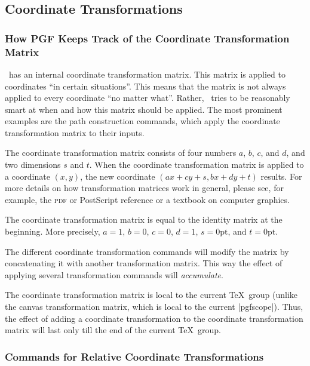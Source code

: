 \subsection{Coordinate Transformations}
\label{section-linear-coordinate-transformations}

\subsubsection{How PGF Keeps Track of the Coordinate Transformation Matrix}
\label{section-transform-cm}

\pgfname\ has an internal coordinate transformation matrix. This matrix is
applied to coordinates ``in certain situations''. This means that the matrix is
not always applied to every coordinate ``no matter what''. Rather, \pgfname\
tries to be reasonably smart at when and how this matrix should be applied. The
most prominent examples are the path construction commands, which apply the
coordinate transformation matrix to their inputs.

The coordinate transformation matrix consists of four numbers $a$, $b$, $c$,
and $d$, and two dimensions $s$ and $t$. When the coordinate transformation
matrix is applied to a coordinate $(x,y)$, the new coordinate
$(ax+cy+s,bx+dy+t)$ results. For more details on how transformation matrices
work in general, please see, for example, the \textsc{pdf} or PostScript
reference or a textbook on computer graphics.

The coordinate transformation matrix is equal to the identity matrix at the
beginning. More precisely, $a=1$, $b=0$, $c=0$, $d=1$, $s=0\mathrm{pt}$, and
$t=0\mathrm{pt}$.

The different coordinate transformation commands will modify the matrix by
concatenating it with another transformation matrix. This way the effect of
applying several transformation commands will \emph{accumulate}.

The coordinate transformation matrix is local to the current \TeX\ group
(unlike the canvas transformation matrix, which is local to the current
|{pgfscope}|). Thus, the effect of adding a coordinate transformation to the
coordinate transformation matrix will last only till the end of the current
\TeX\ group.


\subsubsection{Commands for Relative Coordinate Transformations}

